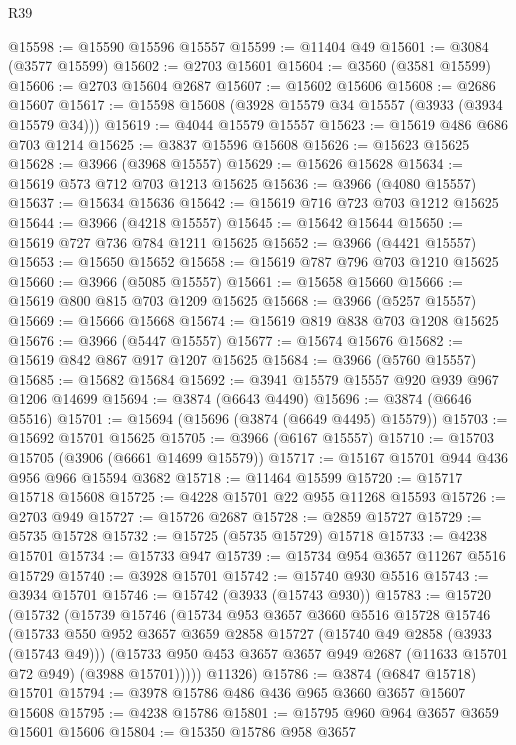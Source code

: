 \begin{lexlean}{R39}
\begin{coremodule}
@15598 := @15590 @15596 @15557
@15599 := @11404 @49
@15601 := @3084 (@3577 @15599)
@15602 := @2703 @15601
@15604 := @3560 (@3581 @15599)
@15606 := @2703 @15604 @2687
@15607 := @15602 @15606
@15608 := @2686 @15607
@15617 := @15598 @15608 (@3928 @15579 @34 @15557 (@3933 (@3934 @15579 @34)))
@15619 := @4044 @15579 @15557
@15623 := @15619 @486 @686 @703 @1214
@15625 := @3837 @15596 @15608
@15626 := @15623 @15625
@15628 := @3966 (@3968 @15557)
@15629 := @15626 @15628
@15634 := @15619 @573 @712 @703 @1213 @15625
@15636 := @3966 (@4080 @15557)
@15637 := @15634 @15636
@15642 := @15619 @716 @723 @703 @1212 @15625
@15644 := @3966 (@4218 @15557)
@15645 := @15642 @15644
@15650 := @15619 @727 @736 @784 @1211 @15625
@15652 := @3966 (@4421 @15557)
@15653 := @15650 @15652
@15658 := @15619 @787 @796 @703 @1210 @15625
@15660 := @3966 (@5085 @15557)
@15661 := @15658 @15660
@15666 := @15619 @800 @815 @703 @1209 @15625
@15668 := @3966 (@5257 @15557)
@15669 := @15666 @15668
@15674 := @15619 @819 @838 @703 @1208 @15625
@15676 := @3966 (@5447 @15557)
@15677 := @15674 @15676
@15682 := @15619 @842 @867 @917 @1207 @15625
@15684 := @3966 (@5760 @15557)
@15685 := @15682 @15684
@15692 := @3941 @15579 @15557 @920 @939 @967 @1206 @14699
@15694 := @3874 (@6643 @4490)
@15696 := @3874 (@6646 @5516)
@15701 := @15694 (@15696 (@3874 (@6649 @4495) @15579))
@15703 := @15692 @15701 @15625
@15705 := @3966 (@6167 @15557)
@15710 := @15703 @15705 (@3906 (@6661 @14699 @15579))
@15717 := @15167 @15701 @944 @436 @956 @966 @15594 @3682
@15718 := @11464 @15599
@15720 := @15717 @15718 @15608
@15725 := @4228 @15701 @22 @955 @11268 @15593
@15726 := @2703 @949
@15727 := @15726 @2687
@15728 := @2859 @15727
@15729 := @5735 @15728
@15732 := @15725 (@5735 @15729) @15718
@15733 := @4238 @15701
@15734 := @15733 @947
@15739 := @15734 @954 @3657 @11267 @5516 @15729
@15740 := @3928 @15701
@15742 := @15740 @930 @5516
@15743 := @3934 @15701
@15746 := @15742 (@3933 (@15743 @930))
@15783 := @15720
    (@15732
      (@15739
        @15746
        (@15734
          @953
          @3657
          @3660
          @5516
          @15728
          @15746
          (@15733
            @550
            @952
            @3657
            @3659
            @2858
            @15727
            (@15740 @49 @2858 (@3933 (@15743 @49)))
            (@15733 @950 @453 @3657 @3657 @949 @2687 (@11633 @15701 @72 @949) (@3988 @15701)))))
      @11326)
@15786 := @3874 (@6847 @15718) @15701
@15794 := @3978 @15786 @486 @436 @965 @3660 @3657 @15607 @15608
@15795 := @4238 @15786
@15801 := @15795 @960 @964 @3657 @3659 @15601 @15606
@15804 := @15350 @15786 @958 @3657

\end{coremodule}
\end{lexlean}
